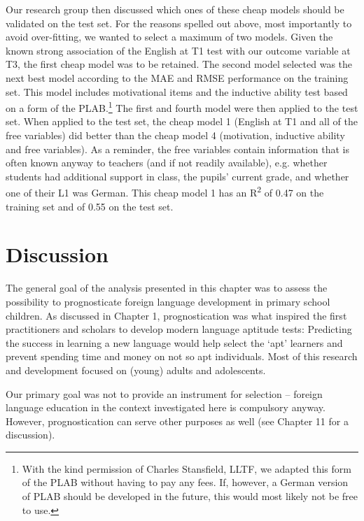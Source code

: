 \documentclass[output=paper]{langsci/langscibook}
\begin{document}
Our research group then discussed which ones of these cheap models should be validated on the test set. For the reasons spelled out above, most importantly to avoid over-fitting, we wanted to select a maximum of two models. Given the known strong association of the English at T1 test with our outcome variable at T3, the first cheap model was to be retained. The second model selected was the next best model according to the MAE and RMSE performance on the training set. This model includes motivational items and the inductive ability test based on a form of the PLAB.\footnote{With the kind permission of Charles Stansfield, LLTF, we adapted this form of the PLAB without having to pay any fees. If, however, a German version of PLAB should be developed in the future, this would most likely not be free to use.} The first and fourth model were then applied to the test set. When applied to the test set, the cheap model 1 (English at T1 and all of the free variables) did better than the cheap model 4 (motivation, inductive ability and free variables). As a reminder, the free variables contain information that is often known anyway to teachers (and if not readily available), e.g. whether students had additional support in class, the pupils’ current grade, and whether one of their L1 was German. This cheap model 1 has an R\textsuperscript{2} of 0.47 on the training set and of 0.55 on the test set. 

\section{Discussion}

The general goal of the analysis presented in this chapter was to assess the possibility to prognosticate foreign language development in primary school children. As discussed in Chapter 1, prognostication was what inspired the first practitioners and scholars to develop modern language aptitude tests: Predicting the success in learning a new language would help select the ‘apt’ learners and prevent spending time and money on not so apt individuals. Most of this research and development focused on (young) adults and adolescents.

Our primary goal was not to provide an instrument for selection –  foreign language education in the context investigated here is compulsory anyway. However, prognostication can serve other purposes as well (see Chapter 11 for a discussion).
\end{document}
